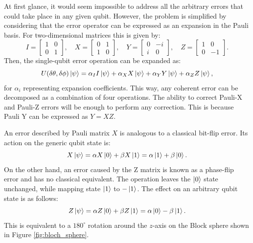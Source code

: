 At first glance, it would seem impossible to address all the arbitrary errors that could take place in any given qubit. However, the problem is simplified by considering that the error operator can be expressed as an expansion in the Pauli basis. For two-dimensional matrices this is given by:
\begin{equation}
    I=\begin{bmatrix}
        1&0\\
        0&1
    \end{bmatrix},\quad
    X=\begin{bmatrix}
        0&1\\
        1&0
    \end{bmatrix}, \quad
    Y=\begin{bmatrix}
        0&-i\\
        i&0
    \end{bmatrix},\quad
    Z=\begin{bmatrix}
        1&0\\
        0&-1
    \end{bmatrix}.
\end{equation}
Then, the single-qubit error operation can be expanded as:
\begin{equation}
    U(\delta\theta,\delta\phi)\ket{\psi}=\alpha_I I\ket{\psi} + \alpha_X X\ket{\psi} + \alpha_Y Y\ket{\psi} + \alpha_Z Z\ket{\psi},
\end{equation}
for $\alpha_i$ representing expansion coefficients. This way, any coherent error can be decomposed as a combination of four operations. The ability to correct Pauli-X and Pauli-Z errors will be enough to perform any correction. This is because Pauli Y can be expressed as $Y=XZ$. 

An error described by Pauli matrix $X$ is analogous to a classical bit-flip error. Its action on the generic qubit state is:
\begin{equation}
    X\ket{\psi}=\alpha X\ket{0}+\beta X\ket{1} = \alpha \ket{1}+\beta \ket{0}.
\end{equation}
On the other hand, an error caused by the Z matrix is known as a phase-flip error and has no classical equivalent. The operation leaves the $\ket{0}$ state unchanged, while mapping state $\ket{1}$ to $-\ket{1}$. The effect on an arbitrary qubit state is as follows:
\begin{equation}
    Z\ket{\psi}=\alpha Z\ket{0}+\beta Z\ket{1} = \alpha \ket{0} -\beta \ket{1}.
\end{equation}
This is equivalent to a $180^\circ$ rotation around the $z$-axis on the Block sphere shown in Figure \ref{fig:bloch_sphere}.

